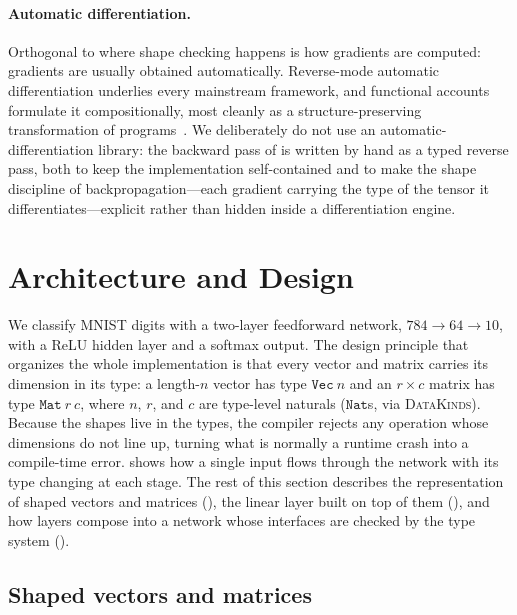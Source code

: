 \documentclass[sigconf,nonacm]{acmart}
\begin{document}
\paragraph{Automatic differentiation.}
Orthogonal to where shape checking happens is how gradients are computed:
gradients are usually obtained automatically. Reverse-mode automatic
differentiation underlies every mainstream framework, and functional accounts
formulate it compositionally, most cleanly as a structure-preserving
transformation of programs~\cite{elliott2018}. We deliberately do not use an
automatic-differentiation library: the backward pass of  is
written by hand as a typed reverse pass, both to keep the implementation
self-contained and to make the shape discipline of backpropagation---each
gradient carrying the type of the tensor it differentiates---explicit rather than
hidden inside a differentiation engine.

\section{Architecture and Design}
\label{sec:architecture}

We classify MNIST digits with a two-layer feedforward network,
\(784 \to 64 \to 10\), with a ReLU hidden layer and a softmax output. The
design principle that organizes the whole implementation is that every vector
and matrix carries its dimension in its type: a length-\(n\) vector has type
\(\mathtt{Vec}\ n\) and an \(r \times c\) matrix has type \(\mathtt{Mat}\ r\ c\),
where \(n\), \(r\), and \(c\) are type-level naturals (\(\mathtt{Nat}\)s, via
\textsc{DataKinds}). Because the shapes live in the types, the compiler rejects
any operation whose dimensions do not line up, turning what is normally a
runtime crash into a compile-time error.  shows how a single
input flows through the network with its type changing at each stage. The rest
of this section describes the representation of shaped vectors and matrices
(), the linear layer built on top of them
(), and how layers compose into a network whose interfaces
are checked by the type system ().

\subsection{Shaped vectors and matrices}
\label{sec:arch:tensors}
\end{document}
